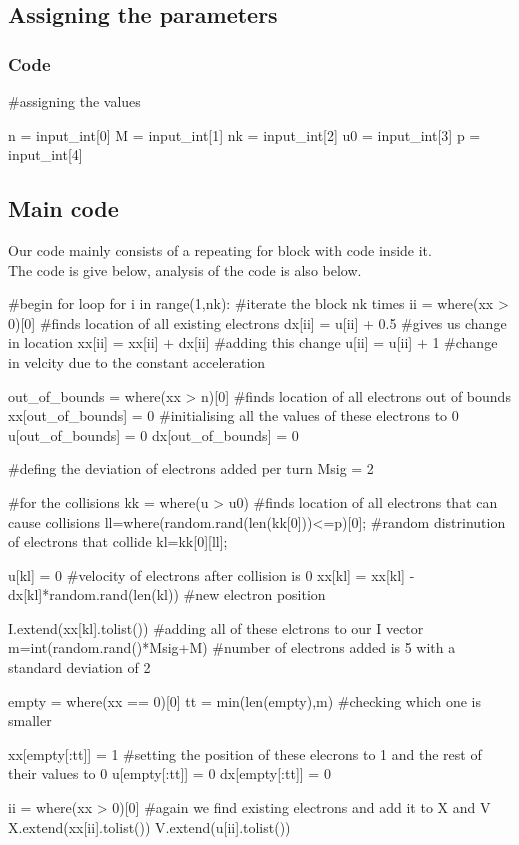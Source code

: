 \documentclass[11pt]{article}
\begin{document}
\subsection{Assigning the parameters}
\subsubsection{Code}
\begin{python}
#assigning the values

n = input_int[0]
M = input_int[1]
nk = input_int[2]
u0 = input_int[3]
p = input_int[4]
\end{python}

\subsection{Main code}
Our code mainly consists of a repeating for block with code inside it.\\The code is give below, analysis of the code is also below.
\begin{python}
#begin for loop
for i in range(1,nk): #iterate the block nk times
	ii = where(xx > 0)[0] 	#finds location of all existing electrons
	dx[ii] = u[ii] + 0.5	#gives us change in location
	xx[ii] = xx[ii] + dx[ii]	#adding this change
	u[ii] = u[ii] + 1			#change in velcity due to the constant acceleration

	out_of_bounds = where(xx > n)[0]	#finds location of all electrons out of bounds
	xx[out_of_bounds] = 0				#initialising all the values of these electrons to 0
	u[out_of_bounds] = 0
	dx[out_of_bounds] = 0

	#defing the deviation of electrons added per turn
	Msig = 2

	#for the collisions
	kk = where(u > u0)	#finds location of all electrons that can cause collisions
	ll=where(random.rand(len(kk[0]))<=p)[0];	#random distrinution of electrons that collide
	kl=kk[0][ll];								

	u[kl] = 0	#velocity of electrons after collision is 0
	xx[kl] = xx[kl] - dx[kl]*random.rand(len(kl))	#new electron position

	I.extend(xx[kl].tolist())	#adding all of these elctrons to our I vector
	m=int(random.rand()*Msig+M)	#number of electrons added is 5 with a standard deviation of 2

	empty = where(xx == 0)[0]
	tt = min(len(empty),m)		#checking which one is smaller

	xx[empty[:tt]] = 1	#setting the position of these elecrons to 1 and the rest of their values to 0
	u[empty[:tt]] = 0
	dx[empty[:tt]] = 0


	ii = where(xx > 0)[0]	#again we find existing electrons and add it to X and V
	X.extend(xx[ii].tolist())
	V.extend(u[ii].tolist())
\end{python}
\end{document}
